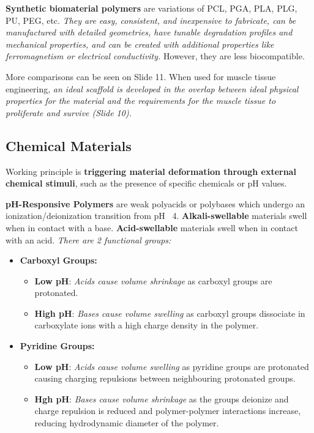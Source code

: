 \documentclass[onecolumn,a4paper]{article}
\begin{document}
\begin{itemize}
    \textbf{Synthetic biomaterial polymers} are variations of PCL, PGA, PLA, PLG, PU, PEG, etc. \emph{They are easy, consistent, and inexpensive to fabricate, can be manufactured with detailed geometries, have tunable degradation profiles and mechanical properties, and can be created with additional properties like ferromagnetism or electrical conductivity.} However, they are less biocompatible.

    More comparisons can be seen on Slide 11. When used for muscle tissue engineering, \emph{an ideal scaffold is developed in the overlap between ideal physical properties for the material and the requirements for the muscle tissue to proliferate and survive (Slide 10).}
\end{itemize}

\subsection{Chemical Materials}

Working principle is \textbf{triggering material deformation through external chemical stimuli}, such as the presence of specific chemicals or pH values.

\textbf{pH-Responsive Polymers} are weak polyacids or polybases which undergo an ionization/deionization transition from pH ~4. \textbf{Alkali-swellable} materials swell when in contact with a base. \textbf{Acid-swellable} materials swell when in contact with an acid. \emph{There are 2 functional groups:}
\begin{itemize}
    \item \textbf{Carboxyl Groups:}
    \begin{itemize}
        \item \textbf{Low pH}: \emph{Acids cause volume shrinkage} as carboxyl groups are protonated.
        \item \textbf{High pH}: \emph{Bases cause volume swelling} as carboxyl groups dissociate in carboxylate ions with a high charge density in the polymer.
    \end{itemize}
    \item \textbf{Pyridine Groups:}
    \begin{itemize}
        \item \textbf{Low pH}: \emph{Acids cause volume swelling} as pyridine groups are protonated causing charging repulsions between neighbouring protonated groups.
        \item \textbf{Hgh pH}: \emph{Bases cause volume shrinkage} as the groups deionize and charge repulsion is reduced and polymer-polymer interactions increase, reducing hydrodynamic diameter of the polymer.
    \end{itemize}
\end{itemize}
\end{document}
